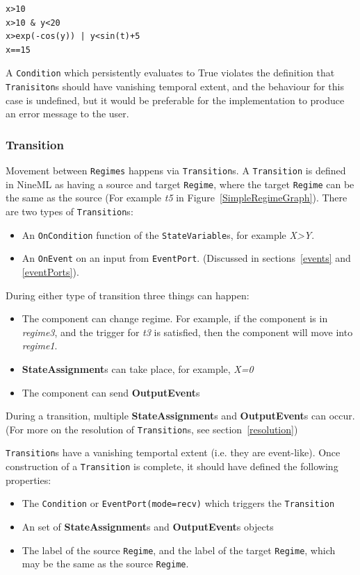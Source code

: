 \documentclass{article}
\newcommand{\nmlClass}[1]{{\tt #1}}
\begin{document}
\begin{verbatim}
x>10
x>10 & y<20
x>exp(-cos(y)) | y<sin(t)+5
x==15
\end{verbatim}

A \nmlClass{Condition} which persistently evaluates to True
violates the definition that \nmlClass{Tranisiton}s should have vanishing
temporal extent, and the behaviour for this case is undefined, but
it would be preferable for the implementation to produce an error
message to the user.

\subsubsection{Transition}

Movement between {\tt Regimes} happens via {\tt Transition}s. A
\nmlClass{Transition} is defined in NineML as having a source and target
\nmlClass{Regime}, where the target \nmlClass{Regime} can be the same as the
source (For example \emph{t5} in Figure~\ref{SimpleRegimeGraph}). There
are two types of {\tt Transition}s:

\begin{itemize}
\item An {\tt OnCondition} function of the {\tt StateVariable}s, for
example \textsl{X>Y}.
\item An {\tt OnEvent} on an input from {\tt EventPort}. (Discussed in
sections~\ref{events} and \ref{eventPorts}).
\end{itemize}

During either type of transition three things can happen:
\begin{itemize}
\item The component can change regime. For example, if
the component is in \emph{regime3}, and the trigger for \emph{t3} is
satisfied, then the component will move into \emph{regime1}.
\item \textbf{StateAssignment}s can take place, for example, \textsl{X=0}
\item The component can send \textbf{OutputEvent}s
\end{itemize}

During a transition, multiple \textbf{StateAssignment}s and
\textbf{OutputEvent}s can occur. (For more on the resolution of
{\tt Transition}s, see section~\ref{resolution})

\nmlClass{Transition}s have a vanishing temportal extent (i.e. they are
event-like). Once construction of a \nmlClass{Transition} is complete, it
should have defined the following properties:
\begin{itemize}
\item The \nmlClass{Condition} or \nmlClass{EventPort(mode=recv)} which
triggers the \nmlClass{Transition}
\item An set of \textbf{StateAssignment}s and \textbf{OutputEvent}s objects
\item The label of the source \nmlClass{Regime}, and the label of the target
\nmlClass{Regime}, which may be the same as the source \nmlClass{Regime}.
\end{itemize}
\end{document}
